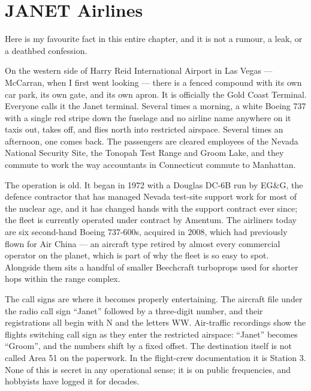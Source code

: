 \section{JANET Airlines}\label{sec:janet}

Here is my favourite fact in this entire chapter, and it is not a rumour, a leak, or a
deathbed confession. 

On the western side of Harry Reid International Airport in Las Vegas --- McCarran, when I
first went looking --- there is a fenced compound with its own car park, its own gate, and
its own apron. It is officially the Gold Coast Terminal. Everyone calls it the Janet
terminal. Several times a morning, a white Boeing 737 with a single red stripe down the
fuselage and no airline name anywhere on it taxis out, takes off, and flies north into
restricted airspace. Several times an afternoon, one comes back. The passengers are
cleared employees of the Nevada National Security Site, the Tonopah Test Range and Groom
Lake, and they commute to work the way accountants in Connecticut commute to Manhattan.

The operation is old. It began in 1972 with a Douglas DC-6B run by EG\&G, the defence
contractor that has managed Nevada test-site support work for most of the nuclear age, and
it has changed hands with the support contract ever since; the fleet is currently operated
under contract by Amentum. The airliners today are six second-hand Boeing 737-600s,
acquired in 2008, which had previously flown for Air China --- an aircraft type retired by
almost every commercial operator on the planet, which is part of why the fleet is so easy
to spot. Alongside them sits a handful of smaller Beechcraft turboprops used for shorter
hops within the range complex.

The call signs are where it becomes properly entertaining. The aircraft file under the
radio call sign ``Janet'' followed by a three-digit number, and their registrations all
begin with N and the letters WW. Air-traffic recordings show the flights switching call
sign as they enter the restricted airspace: ``Janet'' becomes ``Groom'', and the numbers
shift by a fixed offset. The destination itself is not called Area 51 on the paperwork.
In the flight-crew documentation it is Station 3. None of this is secret in any operational
sense; it is on public frequencies, and hobbyists have logged it for decades.

